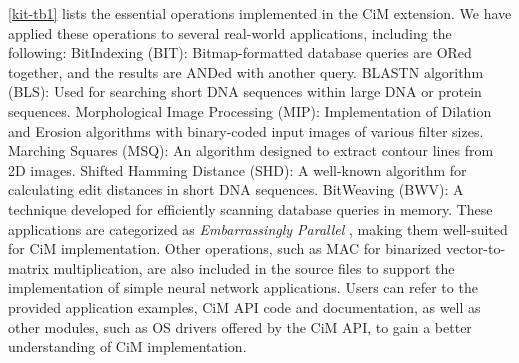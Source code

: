 \cref{kit-tb1} lists the essential operations implemented in the CiM extension. We have applied these operations to several real-world applications, including the following:
 BitIndexing (BIT)\cite{kit/app1}: Bitmap-formatted database queries are ORed together, and the results are ANDed with another query.
 BLASTN algorithm (BLS)\cite{kit/app2}: Used for searching short DNA sequences within large DNA or protein sequences.
 Morphological Image Processing (MIP)\cite{kit/app3}: Implementation of Dilation and Erosion algorithms with binary-coded input images of various filter sizes.
 Marching Squares (MSQ)\cite{kit/app4}: An algorithm designed to extract contour lines from 2D images.
 Shifted Hamming Distance (SHD)\cite{kit/app5}: A well-known algorithm for calculating edit distances in short DNA sequences.
 BitWeaving (BWV)\cite{kit/app6}: A technique developed for efficiently scanning database queries in memory.
These applications are categorized as \textit{Embarrassingly Parallel} \cite{kit/emb}, making them well-suited for CiM implementation.
Other operations, such as MAC for binarized vector-to-matrix multiplication, are also included in the source files to support the implementation of simple neural network applications.
Users can refer to the provided application examples, CiM API code and documentation, as well as other modules, such as OS drivers offered by the CiM API, to gain a better understanding of CiM implementation.


